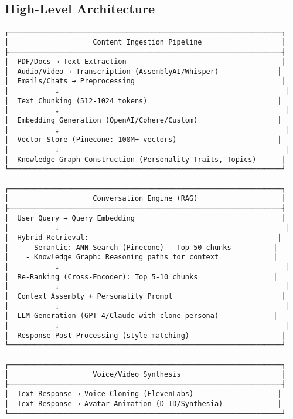 \documentclass[10pt]{article}
\begin{document}
\subsection{High-Level Architecture}

\begin{verbatim}
┌─────────────────────────────────────────────────────────────────┐
│                    Content Ingestion Pipeline                   │
├─────────────────────────────────────────────────────────────────┤
│  PDF/Docs → Text Extraction                                     │
│  Audio/Video → Transcription (AssemblyAI/Whisper)              │
│  Emails/Chats → Preprocessing                                   │
│           ↓                                                      │
│  Text Chunking (512-1024 tokens)                               │
│           ↓                                                      │
│  Embedding Generation (OpenAI/Cohere/Custom)                   │
│           ↓                                                      │
│  Vector Store (Pinecone: 100M+ vectors)                        │
│           ↓                                                      │
│  Knowledge Graph Construction (Personality Traits, Topics)      │
└─────────────────────────────────────────────────────────────────┘

┌─────────────────────────────────────────────────────────────────┐
│                    Conversation Engine (RAG)                    │
├─────────────────────────────────────────────────────────────────┤
│  User Query → Query Embedding                                   │
│           ↓                                                      │
│  Hybrid Retrieval:                                             │
│    - Semantic: ANN Search (Pinecone) - Top 50 chunks          │
│    - Knowledge Graph: Reasoning paths for context             │
│           ↓                                                      │
│  Re-Ranking (Cross-Encoder): Top 5-10 chunks                  │
│           ↓                                                      │
│  Context Assembly + Personality Prompt                          │
│           ↓                                                      │
│  LLM Generation (GPT-4/Claude with clone persona)             │
│           ↓                                                      │
│  Response Post-Processing (style matching)                      │
└─────────────────────────────────────────────────────────────────┘

┌─────────────────────────────────────────────────────────────────┐
│                    Voice/Video Synthesis                        │
├─────────────────────────────────────────────────────────────────┤
│  Text Response → Voice Cloning (ElevenLabs)                    │
│  Text Response → Avatar Animation (D-ID/Synthesia)             │
└─────────────────────────────────────────────────────────────────┘
\end{verbatim}
\end{document}
